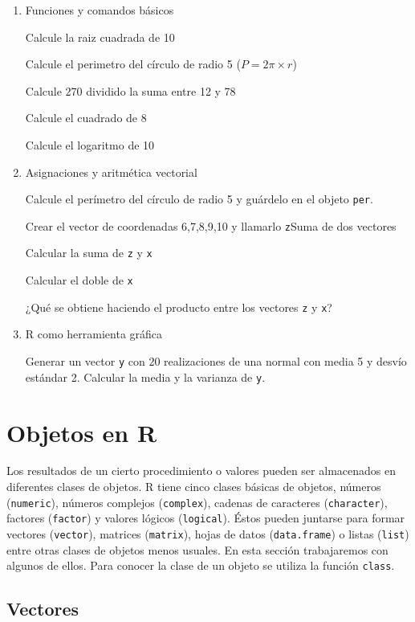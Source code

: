 \documentclass[
]{book}
\begin{document}
\begin{enumerate}
\def\labelenumi{\arabic{enumi}.}
\item
  Funciones y comandos básicos

  Calcule la raiz cuadrada de 10

  Calcule el perimetro del círculo de radio 5 (\(P = 2\pi \times r\))

  Calcule 270 dividido la suma entre 12 y 78

  Calcule el cuadrado de 8

  Calcule el logaritmo de 10
\item
  Asignaciones y aritmética vectorial

  Calcule el perímetro del círculo de radio 5 y guárdelo en el objeto \texttt{per}.

  Crear el vector de coordenadas 6,7,8,9,10 y llamarlo \texttt{z}Suma de dos vectores

  Calcular la suma de \texttt{z} y \texttt{x}

  Calcular el doble de \texttt{x}

  ¿Qué se obtiene haciendo el producto entre los vectores \texttt{z} y \texttt{x}?
\item
  R como herramienta gráfica

  Generar un vector \texttt{y} con 20 realizaciones de una normal con media 5 y desvío estándar 2. Calcular la media y la varianza de \texttt{y}.
\end{enumerate}

\hypertarget{objetos-en-r}{%
\chapter{Objetos en R}\label{objetos-en-r}}

Los resultados de un cierto procedimiento o valores pueden ser almacenados en diferentes clases de objetos. R tiene cinco clases básicas de objetos, números (\texttt{numeric}), números complejos (\texttt{complex}), cadenas de caracteres (\texttt{character}), factores (\texttt{factor}) y valores lógicos (\texttt{logical}). Éstos pueden juntarse para formar vectores (\texttt{vector}), matrices (\texttt{matrix}), hojas de datos (\texttt{data.frame}) o listas (\texttt{list}) entre otras clases de objetos menos usuales. En esta sección trabajaremos con algunos de ellos. Para conocer la clase de un objeto se utiliza la función \texttt{class}.

\hypertarget{vectores}{%
\section{Vectores}\label{vectores}}
\end{document}
